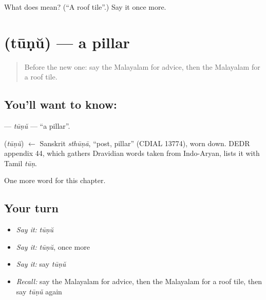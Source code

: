 \begin{tcolorbox}[breakable,colback=teal!4,colframe=teal!35!black,title={Before you move on}]
What does  mean? (\textquotedblleft{}A roof tile\textquotedblright{}.) Say it once more.
\end{tcolorbox}
\section[\texorpdfstring{\ml{തൂണ്} (tūṇŭ)}{തൂണ് (tūṇŭ)}]{ (tūṇŭ) — a pillar}

\label{lesson:ML-C257-tunu}



\begin{quote}
Before the new one: say the Malayalam for advice, then the Malayalam for a roof tile.
\end{quote}

\subsection*{You'll want to know: }
\textbf{} — \emph{tūṇŭ} — \textquotedblleft{}a pillar\textquotedblright{}.

\begin{cousinweb}
\textbf{} (\emph{tūṇŭ}) $\leftarrow$ Sanskrit \emph{sthūṇā}, \textquotedblleft{}post, pillar\textquotedblright{} (CDIAL 13774), worn down. DEDR appendix 44, which gathers Dravidian words taken from Indo-Aryan, lists it with Tamil \emph{tūṇ}.
\end{cousinweb}

\begin{grammarlens}[title={What you've built}]
One more word for this chapter.
\end{grammarlens}

\subsection*{Your turn}
\begin{itemize}
\raggedright
  \item \emph{Say it:} \emph{tūṇŭ}
  \item \emph{Say it:} \emph{tūṇŭ}, once more
  \item \emph{Say it:} say \emph{tūṇŭ}
  \item \emph{Recall:} say the Malayalam for advice, then the Malayalam for a roof tile, then say \emph{tūṇŭ} again
\end{itemize}


